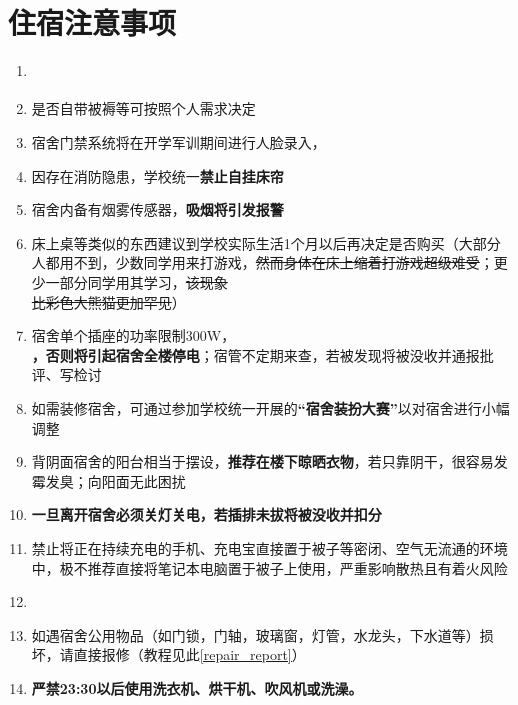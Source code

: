 \section[住宿注意事项]{住宿注意事项}
\begin{enumerate}
      \item \textbf{}
            \label{random_allocation}
      \item 是否自带被褥等可按照个人需求决定\footnotemark
      \item 宿舍门禁系统将在开学军训期间进行人脸录入，\textbf{}
      \item 因存在消防隐患，学校统一\textbf{禁止自挂床帘}
      \item 宿舍内备有烟雾传感器，\textbf{吸烟将引发报警}
      \item 床上桌等类似的东西建议到学校实际生活1个月以后再决定是否购买（大部分人都用不到，少数同学用来打游戏，\sout{然而身体在床上缩着打游戏超级难受}；更少一部分同学用其学习，\sout{该现象\\比彩色大熊猫更加罕见}）
      \item 宿舍单个插座的功率限制300W\footnotemark，\textbf{}\\\textbf{，否则将引起宿舍全楼停电}；宿管不定期来查，若被发现将被没收并通报批评、写检讨
      \item 如需装修宿舍，可通过参加学校统一开展的\textbf{“宿舍装扮大赛”}\footnotemark 以对宿舍进行小幅调整
      \item 背阴面宿舍的阳台相当于摆设，\textbf{推荐在楼下晾晒衣物}，若只靠阴干，很容易发霉发臭；向阳面无此困扰
      \item \textbf{一旦离开宿舍必须关灯关电，若插排未拔将被没收并扣分}
      \item 禁止将正在持续充电的手机、充电宝直接置于被子等密闭、空气无流通的环境中，极不推荐直接将笔记本电脑置于被子上使用，严重影响散热且有着火风险
      \item \textbf{}\\
      \item 如遇宿舍公用物品（如门锁，门轴，玻璃窗，灯管，水龙头，下水道等）损坏，请直接报修（教程见此\uline{\ref{repair_report}}）
      \item \textbf{严禁23:30以后使用洗衣机、烘干机、吹风机或洗澡。}
\end{enumerate}

